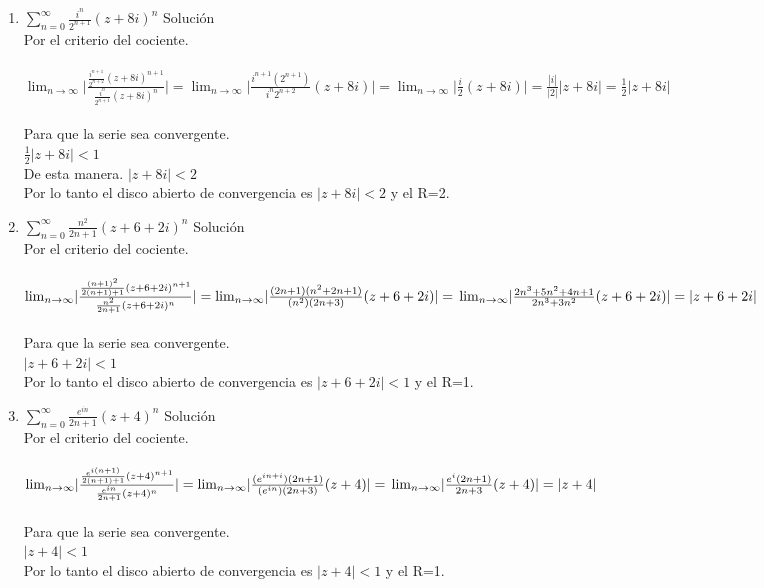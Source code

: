 \documentclass[12pt,letterpaper]{article}
\providecommand{\abs}[1]{\lvert#1\rvert}
\begin{document}
\begin{enumerate}
\item $\sum\limits_{n=0}^\infty\frac{i^n}{2^{n+1}}(z+8i)^n$
Soluci\'on\\
Por el criterio del cociente.\\ \\
$\lim_{n \to \infty}\abs{\frac{\frac{i^{n+1}}{2^{n+2}}(z+8i)^{n+1}}{\frac{i^n}{2^{n+1}}(z+8i)^n}}= \lim_{n \to \infty}\abs{\frac{i^{n+1}(2^{n+1})}{i^{n}2^{n+2}}(z+8i)}= \lim_{n \to \infty}\abs{\frac{i}{2}(z+8i)}=\frac{|i|}{|2|}\abs{z+8i}=\frac{1}{2}|z+8i|$\\ \\
Para que la serie sea convergente.\\
$\frac{1}{2}\abs{z+8i} < 1$\\ 
De esta manera.
$\abs{z+8i} < 2$\\
Por lo tanto el disco abierto de convergencia es $\abs{z+8i} < 2$ y el R=2.

\item $\sum\limits_{n=0}^\infty\frac{n^2}{2n+1}(z+6+2i)^n$
Soluci\'on\\
Por el criterio del cociente.\\ \\
$\lim_{n \to \infty}\abs{\frac{\frac{(n+1)^2}{2(n+1)+1}(z+6+2i)^{n+1}}{\frac{n^2}{2n+1}(z+6+2i)^n}}= \lim_{n \to \infty}\abs{\frac{(2n+1)(n^2+2n+1)}{(n^2)(2n+3)}(z+6+2i)}= \\ \lim_{n \to \infty}\abs{\frac{2n^3+5n^2+4n+1}{2n^3+3n^2}(z+6+2i)}=\abs{z+6+2i}$\\ \\
Para que la serie sea convergente.\\
$\abs{z+6+2i} < 1$\\ 
Por lo tanto el disco abierto de convergencia es $\abs{z+6+2i} < 1$ y el R=1.

\item $\sum\limits_{n=0}^\infty\frac{e^{in}}{2n+1}(z+4)^n$
Soluci\'on\\
Por el criterio del cociente.\\ \\
$\lim_{n \to \infty}\abs{\frac{\frac{e^{i(n+1)}}{2(n+1)+1}(z+4)^{n+1}}{\frac{e^{in}}{2n+1}(z+4)^n}}= \lim_{n \to \infty}\abs{\frac{(e^{in+i})(2n+1)}{(e^{in})(2n+3)}(z+4)}= \\ \lim_{n \to \infty}\abs{\frac{e^i(2n+1)}{2n+3}(z+4)}=\abs{z+4}$\\ \\
Para que la serie sea convergente.\\
$\abs{z+4} < 1$\\ 
Por lo tanto el disco abierto de convergencia es $\abs{z+4} < 1$ y el R=1.


\end{enumerate}
\end{document}
